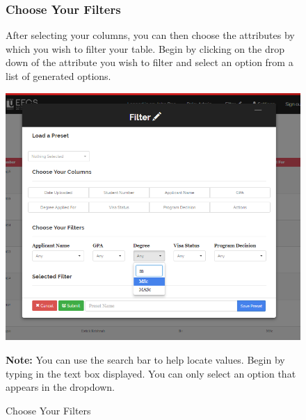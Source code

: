 \documentclass[fontsize=12pt,paper=letter,twoside]{scrartcl}
\begin{document}
\clearpage
\begin{figure}[!htb]
\subsubsection{Choose Your Filters}
After selecting your columns, you can then choose the attributes by which you wish to filter your table. Begin by clicking on the drop down of the attribute you wish to filter and select an option from a list of generated options.

\begin{center}
\includegraphics[width=.99\textwidth]{images/ma/selected_filter.png}
\end{center}
\caption{Choose Your Filters}

\smallskip
\noindent \textbf{Note:} You can use the search bar to help locate values. Begin by typing in the text box displayed. You can only select an option that appears in the dropdown.
\label{fig:choose_filters}
\end{figure} 
\end{document}
